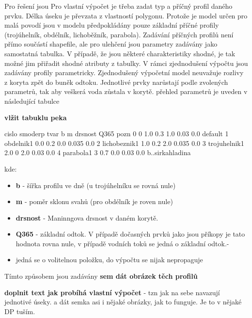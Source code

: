 

Pro řešení jsou Pro vlastní výpočet je třeba zadat typ a příčný profil daného prvku. Délka úseku je převzata z vlastností polygonu. Protože je model určen pro malá povodí jsou v modelu předpokládány pouze základní příčné profily (trojúhelník, obdélník, lichoběžník, parabola). 
Zadávání příčných profilů není přímo součástí shapefile, ale pro ulehčení jsou parametry zadávány jako samostatná tabulka. V případě, že jsou některé charakteristiky shodné, je tak možné jim přiřadit shodné atributy z tabulky.
V rámci zjednodušení výpočtu jsou zadávány profily parametricky. Zjednodušený výpočetní model neuvažuje rozlivy z koryta zpět do buněk odtoku. Jednotlivé prvky narůstají podle zvolených parametrů, tak aby veškerá voda zůstala v korytě.
přehled parametrů je uveden v následující tabulce

\textbf{vlžit tabuklu peka}

cislo	smoderp	tvar	b	m	drsnost	Q365	pozn
0	0	1.0	0.3	1.0	0.03	0.0	default
1	obdelnik1	0.0	0.2	0.0	0.035	0.0
2	lichobeznik1	1.0	0.2	2.0	0.035	0.0
3	trojuhelnik1	2.0	0	2.0	0.03	0.0
4	parabola1	3	0.7	0.0	0.03	0.0	b..sirkahladina




kde:
\begin{itemize}
\item \textbf{b} - šířka profilu ve dně (u trojúhelníku se rovná nule)
\item \textbf{m} - poměr sklonu svahů (pro obdélník je roven nule)
\item \textbf{drsnost} - Maninngova drsnost v daném korytě.
\item \textbf{Q365} - základní odtok. V případě dočasných prvků jako jsou příkopy je tato hodnota rovna nule, v případě vodních toků se jedná o základní odtok.-
\item jedná se o volitelnou položku, do výpočtu se nijak nepropaguje
\end{itemize}

Tímto způsobem jsou zadávány
\textbf{sem dát obrázek těch profilů}


\textbf{doplnit text jak probíhá vlastní výpočet} - tzn jak na sebe navazují jednotivé úseky. a dát semka asi i nějaké  obrázky, jak to funguje. Je to v nějaké DP tuším.


